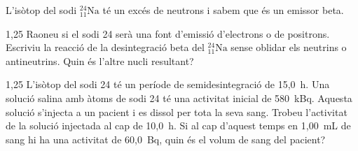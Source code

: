 L'isòtop del sodi ${}^{24}_{11}\mathrm{Na}$ té un excés de neutrons i sabem que és un emissor beta.

\begin{apartat}{1,25}
Raoneu si el sodi 24 serà una font d'emissió d'electrons o de positrons. Escriviu la reacció de la desintegració beta del ${}^{24}_{11}\mathrm{Na}$ sense oblidar els neutrins o antineutrins. Quin és l'altre nucli resultant?
\end{apartat}

\begin{apartat}{1,25}
L'isòtop del sodi 24 té un període de semidesintegració de 15,0~h. Una solució salina amb àtoms de sodi 24 té una activitat inicial de 580~kBq. Aquesta solució s'injecta a un pacient i es dissol per tota la seva sang. Trobeu l'activitat de la solució injectada al cap de 10,0~h. Si al cap d'aquest temps en 1,00~mL de sang hi ha una activitat de 60,0~Bq, quin és el volum de sang del pacient?
\end{apartat}

